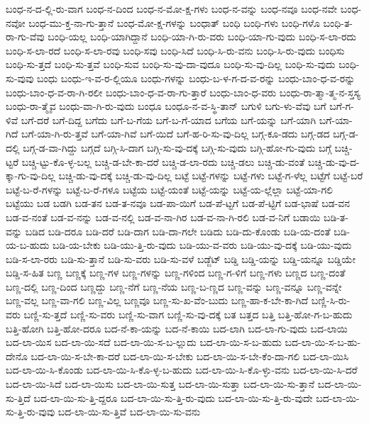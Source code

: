 {ಬಂಧ-ನ-ದ-ಲ್ಲಿ-ರು-ವಾಗ
ಬಂಧ-ನ-ದಿಂದ
ಬಂಧ-ನ-ಮೋ-ಕ್ಷ-ಗಳು
ಬಂಧ-ನ-ವನ್ನು
ಬಂಧ-ನವೂ
ಬಂಧ-ನವೇ
ಬಂಧ-ನವೋ
ಬಂಧ-ಮು-ಕ್ತ-ನಾ-ಗು-ತ್ತಾನೆ
ಬಂಧ-ಮೋ-ಕ್ಷ-ಗಳನ್ನು
ಬಂಧಾತ್
ಬಂಧಿ
ಬಂಧಿ-ಗಳು
ಬಂಧಿ-ಗಳೊ
ಬಂಧಿ-ತ-ರಾ-ಗು-ವೆವು
ಬಂಧಿ-ಯಲ್ಲ
ಬಂಧಿ-ಯಾಗಿದ್ದಾನೆ
ಬಂಧಿ-ಯಾ-ಗಿ-ರು-ವರು
ಬಂಧಿ-ಯಾ-ಗು-ವುದು
ಬಂಧಿ-ಸ-ಲಾ-ರದು
ಬಂಧಿ-ಸ-ಲಾ-ರದೆ
ಬಂಧಿ-ಸ-ಲಾ-ರವು
ಬಂಧಿ-ಸವು
ಬಂಧಿ-ಸಿದೆ
ಬಂಧಿ-ಸಿ-ರು-ವನು
ಬಂಧಿ-ಸಿ-ರು-ವುದು
ಬಂಧಿಸು
ಬಂಧಿ-ಸು-ತ್ತದೆ
ಬಂಧಿ-ಸು-ತ್ತವೆ
ಬಂಧಿ-ಸುವ
ಬಂಧಿ-ಸು-ವು-ದಾ-ವುದೂ
ಬಂಧಿ-ಸು-ವು-ದಿಲ್ಲ
ಬಂಧಿ-ಸು-ವುದು
ಬಂಧಿ-ಸು-ವುವು
ಬಂಧು
ಬಂಧು-ಇ-ವ-ರ-ಲ್ಲಿಯೂ
ಬಂಧು-ಗಳನ್ನು
ಬಂಧು-ಬ-ಳ-ಗ-ದ-ವ-ರನ್ನು
ಬಂಧು-ಬಾಂ-ಧ-ವ-ರನ್ನು
ಬಂಧು-ಬಾಂ-ಧ-ವ-ರಾ-ಗಿ-ರಲೀ
ಬಂಧು-ಬಾಂ-ಧ-ವ-ರಾ-ಗು-ತ್ತಾರೆ
ಬಂಧು-ಬಾಂ-ಧ-ವರು
ಬಂಧು-ರಾ-ತ್ಮಾ-ತ್ಮ-ನ-ಸ್ತಸ್ಯ
ಬಂಧು-ರಾ-ತ್ಮೈವ
ಬಂಧು-ವಾ-ಗಿ-ರು-ವುದು
ಬಂಧೂ
ಬಂಧೂ-ನ-ವ-ಸ್ಥಿ-ತಾನ್
ಬಗುಳಿ
ಬಗು-ಳು-ವೆವು
ಬಗೆ
ಬಗೆ-ಗ-ಳಿವೆ
ಬಗೆ-ದರೆ
ಬಗೆ-ದಿದ್ದ
ಬಗೆದು
ಬಗೆ-ಬ-ಗೆಯ
ಬಗೆ-ಬ-ಗೆ-ಯಾದ
ಬಗೆಯ
ಬಗೆ-ಯನ್ನು
ಬಗೆ-ಯಾಗಿ
ಬಗೆ-ಯಾ-ಗಿದೆ
ಬಗೆ-ಯಾ-ಗಿ-ರು-ತ್ತವೆ
ಬಗೆ-ಯಾ-ಗಿವೆ
ಬಗೆ-ಯಿದೆ
ಬಗೆ-ಹ-ರಿ-ಸು-ವು-ದಿಲ್ಲ
ಬಗ್ಗ-ಕೂ-ಡದು
ಬಗ್ಗ-ಡದ
ಬಗ್ಗ-ಡ-ದಲ್ಲಿ
ಬಗ್ಗ-ಡ-ವಾ-ಗಿದ್ದು
ಬಗ್ಗದೆ
ಬಗ್ಗಿ-ಸಿ-ದಾಗ
ಬಗ್ಗಿ-ಸು-ವು-ದಕ್ಕೆ
ಬಗ್ಗಿ-ಸು-ವುದು
ಬಗ್ಗಿ-ಹೋ-ಗು-ವುದು
ಬಗ್ಗೆ
ಬಚ್ಚಿ-ಟ್ಟರೆ
ಬಚ್ಚಿ-ಟ್ಟು-ಕೊ-ಳ್ಳ-ಬಲ್ಲ
ಬಚ್ಚಿ-ಡ-ಬೇ-ಕಾ-ದರೆ
ಬಚ್ಚಿ-ಡ-ಲಾ-ರದು
ಬಚ್ಚಿ-ಡಲು
ಬಚ್ಚಿ-ಡು-ವಂತೆ
ಬಚ್ಚಿ-ಡು-ವು-ದ-ಕ್ಕಾ-ಗು-ವು-ದಿಲ್ಲ
ಬಚ್ಚಿ-ಡು-ವು-ದಕ್ಕೆ
ಬಚ್ಚಿ-ಡು-ವು-ದಿಲ್ಲ
ಬಟ್ಟೆ
ಬಟ್ಟೆ-ಗಳನ್ನು
ಬಟ್ಟೆ-ಗಳು
ಬಟ್ಟೆ-ಗ-ಳೆಲ್ಲ
ಬಟ್ಟೆಗೆ
ಬಟ್ಟೆ-ಬರೆ
ಬಟ್ಟೆ-ಬ-ರೆ-ಗಳನ್ನು
ಬಟ್ಟೆ-ಬ-ರೆ-ಗಳೂ
ಬಟ್ಟೆಯ
ಬಟ್ಟೆ-ಯಂತೆ
ಬಟ್ಟೆ-ಯನ್ನು
ಬಟ್ಟೆ-ಯ-ಲ್ಲೆಲ್ಲಾ
ಬಟ್ಟೆ-ಯಾ-ಗಲಿ
ಬಟ್ಟೆಯು
ಬಡ
ಬಡಗಿ
ಬಡ-ತನ
ಬಡ-ತ-ನವೂ
ಬಡ-ಪಾ-ಯಿಗೆ
ಬಡ-ಪೆ-ಟ್ಟಗೆ
ಬಡ-ಪೆ-ಟ್ಟಿಗೆ
ಬಡ-ಭಾಷೆ
ಬಡ-ವನ
ಬಡ-ವ-ನಂತೆ
ಬಡ-ವ-ನನ್ನು
ಬಡ-ವ-ನಲ್ಲಿ
ಬಡ-ವ-ನಾ-ಗಿರ
ಬಡ-ವ-ನಾ-ಗಿ-ರಲಿ
ಬಡ-ವ-ನಿಗೆ
ಬಡಾಯಿ
ಬಡಿ-ತ-ವನ್ನು
ಬಡಿದ
ಬಡಿ-ದರೂ
ಬಡಿ-ದರೆ
ಬಡಿ-ದಾಗ
ಬಡಿ-ದಾ-ಗಲೇ
ಬಡಿದು
ಬಡಿ-ದು-ಕೊಂಡು
ಬಡಿ-ಯ-ದಂತೆ
ಬಡಿ-ಯ-ಬ-ಹುದು
ಬಡಿ-ಯ-ಬೇಕು
ಬಡಿ-ಯು-ತ್ತಿ-ರು-ವುದು
ಬಡಿ-ಯು-ವ-ವರು
ಬಡಿ-ಯು-ವು-ದಕ್ಕೆ
ಬಡಿ-ಯು-ವುದು
ಬಡಿ-ಸ-ಲಾ-ರರು
ಬಡಿ-ಸು-ತ್ತಾನೆ
ಬಡಿ-ಸು-ವರು
ಬಡಿ-ಸು-ವಳೆ
ಬಡ್ಜೆಟ್
ಬಡ್ಡಿ
ಬಡ್ಡಿ-ಯನ್ನು
ಬಡ್ಡಿ-ಯನ್ನೂ
ಬಡ್ಡಿಯೇ
ಬಡ್ಡಿ-ಸ-ಹಿತ
ಬಣ್ಣ
ಬಣ್ಣಕ್ಕೆ
ಬಣ್ಣ-ಗಳ
ಬಣ್ಣ-ಗಳನ್ನು
ಬಣ್ಣ-ಗಳಿಂದ
ಬಣ್ಣ-ಗ-ಳಿಗೆ
ಬಣ್ಣ-ಗಳು
ಬಣ್ಣದ
ಬಣ್ಣ-ದಂತೆ
ಬಣ್ಣ-ದಲ್ಲಿ
ಬಣ್ಣ-ದಿಂದ
ಬಣ್ಣದ್ದು
ಬಣ್ಣ-ನೆಗೆ
ಬಣ್ಣ-ನೆಯ
ಬಣ್ಣ-ಬ-ಣ್ಣದ
ಬಣ್ಣ-ವನ್ನು
ಬಣ್ಣ-ವನ್ನೂ
ಬಣ್ಣ-ವನ್ನೇ
ಬಣ್ಣ-ವಲ್ಲ
ಬಣ್ಣ-ವಾ-ಗಲಿ
ಬಣ್ಣ-ವಿಲ್ಲ
ಬಣ್ಣವೂ
ಬಣ್ಣ-ಸು-ಖ-ವೆಂ-ಬುದು
ಬಣ್ಣ-ಹಾ-ಕ-ಬೇ-ಕಾ-ಗಿದೆ
ಬಣ್ಣಿ-ಸಿ-ರು-ವರು
ಬಣ್ಣಿ-ಸು-ತ್ತದೆ
ಬಣ್ಣಿ-ಸು-ವರು
ಬಣ್ಣಿ-ಸು-ವಾಗ
ಬಣ್ಣಿ-ಸು-ವು-ದಕ್ಕೆ
ಬತ
ಬತ್ತದ
ಬತ್ತಿ
ಬತ್ತಿ-ಹೋ-ಗ-ಬ-ಹುದು
ಬತ್ತಿ-ಹೋಗಿ
ಬತ್ತಿ-ಹೋ-ದರೂ
ಬದ-ನೆ-ಕಾ-ಯನ್ನು
ಬದ-ನೆ-ಕಾಯಿ
ಬದ-ಲಾಗಿ
ಬದ-ಲಾ-ಗು-ವುದು
ಬದ-ಲಾಯಿ
ಬದ-ಲಾ-ಯಿಸ
ಬದ-ಲಾ-ಯಿ-ಸದೆ
ಬದ-ಲಾ-ಯಿ-ಸ-ಬ-ಲ್ಲುದು
ಬದ-ಲಾ-ಯಿ-ಸ-ಬ-ಹುದು
ಬದ-ಲಾ-ಯಿ-ಸ-ಬ-ಹು-ದೇನೊ
ಬದ-ಲಾ-ಯಿ-ಸ-ಬೇ-ಕಾ-ದರೆ
ಬದ-ಲಾ-ಯಿ-ಸ-ಬೇಕು
ಬದ-ಲಾ-ಯಿ-ಸ-ಬೇ-ಕೆಂ-ದಾ-ಗಲಿ
ಬದ-ಲಾ-ಯಿಸಿ
ಬದ-ಲಾ-ಯಿ-ಸಿ-ಕೊಂಡು
ಬದ-ಲಾ-ಯಿ-ಸಿ-ಕೊ-ಳ್ಳ-ಬ-ಹುದು
ಬದ-ಲಾ-ಯಿ-ಸಿ-ಕೊ-ಳ್ಳು-ವನು
ಬದ-ಲಾ-ಯಿ-ಸಿ-ದರೆ
ಬದ-ಲಾ-ಯಿ-ಸಿದೆ
ಬದ-ಲಾ-ಯಿಸು
ಬದ-ಲಾ-ಯಿ-ಸುತ್ತ
ಬದ-ಲಾ-ಯಿ-ಸುತ್ತಾ
ಬದ-ಲಾ-ಯಿ-ಸು-ತ್ತಾನೆ
ಬದ-ಲಾ-ಯಿ-ಸು-ತ್ತಿದೆ
ಬದ-ಲಾ-ಯಿ-ಸು-ತ್ತಿ-ದ್ದರೂ
ಬದ-ಲಾ-ಯಿ-ಸು-ತ್ತಿ-ರು-ವುದು
ಬದ-ಲಾ-ಯಿ-ಸು-ತ್ತಿ-ರು-ವುದೇ
ಬದ-ಲಾ-ಯಿ-ಸು-ತ್ತಿ-ರು-ವುವು
ಬದ-ಲಾ-ಯಿ-ಸು-ತ್ತಿವೆ
ಬದ-ಲಾ-ಯಿ-ಸು-ವನು
}
